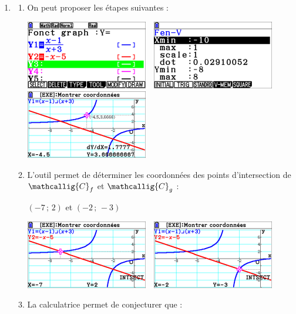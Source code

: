 \documentclass[a4paper,11pt]{article}
\begin{document}
\medskip


\begin{enumerate}
	\item 
	\begin{enumerate}
		\item On peut proposer les étapes suivantes :
		
		\begin{center}
			\includegraphics[height=3cm]{ch04_exos_corr_4a}~~\includegraphics[height=3cm]{ch04_exos_corr_4b}~~\includegraphics[height=3cm]{ch04_exos_corr_4c}
		\end{center}
		\item L'outil  permet de déterminer les coordonnées des points d'intersection de $\mathcallig{C}_f$ et $\mathcallig{C}_g$ :
		
		\hfill{}$(-7\,;\,2)$ et $(-2\,;\,-3)$\hfill~
		
		\begin{center}
			\includegraphics[height=3cm]{ch04_exos_corr_4d}~~\includegraphics[height=3cm]{ch04_exos_corr_4e}
		\end{center}
		\item La calculatrice permet de conjecturer que :
		

\end{enumerate}
\end{enumerate}
\end{document}
